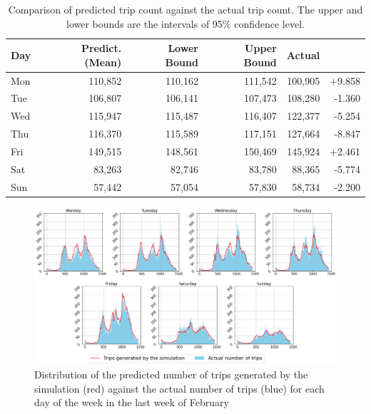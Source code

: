 \documentclass[runningheads]{llncs}
\begin{document}
\begin{table}[h]
\centering
\begin{tabularx}{\columnwidth}{|X|r|r|r|r|r|}
        \hline
        {\centering Day}     & {\centering Predict. (Mean)}  & {\centering Lower Bound}  & {\centering Upper Bound}  & {\centering Actual} & {\centering {$\delta(\%)$}}    \\
        \hline
        Mon     & 110,852    & 110,162    & 111,542    & 100,905  & +9.858 \\
        Tue     & 106,807    & 106,141    & 107,473    & 108,280   & -1.360 \\
        Wed     & 115,947    & 115,487    & 116,407    & 122,377   & -5.254 \\
        Thu     & 116,370    & 115,589    & 117,151    & 127,664   & -8.847 \\
        Fri     & 149,515    & 148,561    & 150,469    & 145,924   & +2.461 \\
        Sat     & 83,263     & 82,746     & 83,780     & 88,365    & -5.774 \\
        Sun     & 57,442     & 57,054     & 57,830     & 58,734    & -2.200 \\
        \hline
\end{tabularx}
\caption{Comparison of predicted trip count against the actual trip count. The upper and lower bounds are the intervals of 95\% confidence level.} 
\label{tab1}
\end{table}

\begin{figure}[h!]
\centering
\includegraphics[width=0.97\columnwidth]{Daily_dist.png} %
\caption{Distribution of the predicted number of trips generated by the simulation (red) against the actual number of trips (blue) for each day of the week in the last week of February}
\label{fig1}
\end{figure}
\end{document}
